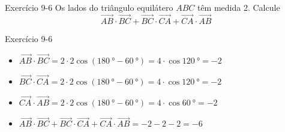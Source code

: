 \begin{frame}[c]{Exercício 9-6}
    Os lados do triângulo equilátero \(ABC\) têm medida 2. Calcule
    \[
        \vec{AB}\cdot\vec{BC}+\vec{BC}\cdot\vec{CA}+\vec{CA}\cdot\vec{AB}
    \]
\end{frame}
\begin{frame}{Exercício 9-6}
   \begin{center}
    \end{center}
    \begin{itemize}[<+->]
        \item \(
        \vec{AB}\cdot\vec{BC}=
        2\cdot 2 \cos{(\SI{180}{\degree}-\SI{60}{\degree})}=
        4\cdot\cos{\SI{120}{\degree}}=-2
        \)
        \item \(
        \vec{BC}\cdot\vec{CA}=
        2\cdot 2 \cos{(\SI{180}{\degree}-\SI{60}{\degree})}=
        4\cdot\cos{\SI{120}{\degree}}=-2
        \)
        \item \(
        \vec{CA}\cdot\vec{AB}=
        2\cdot 2 \cos{(\SI{180}{\degree}-\SI{60}{\degree})}=
        4\cdot\cos{\SI{60}{\degree}}=-2
        \)
        \item \(\vec{AB}\cdot\vec{BC} + \vec{BC}\cdot\vec{CA} +
        \vec{CA}\cdot\vec{AB}=-2-2-2=-6\)
    \end{itemize}
\end{frame}

